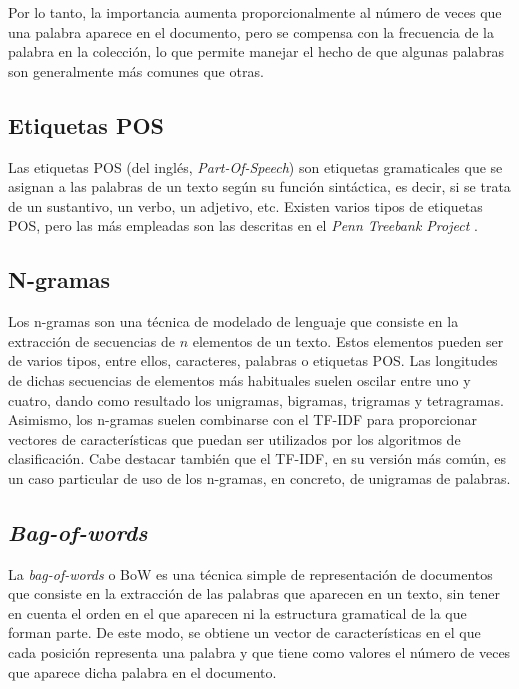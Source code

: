 \bigskip
Por lo tanto, la importancia aumenta proporcionalmente al número de veces que una palabra aparece en el documento, pero se compensa con la frecuencia
de la palabra en la colección, lo que permite manejar el hecho de que algunas palabras son generalmente más comunes que otras.

\subsection{Etiquetas POS}

Las etiquetas POS (del inglés, \textit{Part-Of-Speech}) son etiquetas gramaticales que se asignan a las palabras de un texto según su función sintáctica, es
decir, si se trata de un sustantivo, un verbo, un adjetivo, etc.
Existen varios tipos de etiquetas POS, pero las más empleadas son las descritas en el \textit{Penn Treebank Project} \cite{marcus1993building}.

\subsection{N-gramas}

Los n-gramas son una técnica de modelado de lenguaje que consiste en la extracción de secuencias de $n$ elementos de un texto. Estos elementos pueden ser de varios
tipos, entre ellos, caracteres, palabras o etiquetas POS. Las longitudes de dichas secuencias de elementos más habituales suelen oscilar entre uno y cuatro, dando como resultado los unigramas, bigramas,
trigramas y tetragramas.
Asimismo, los n-gramas suelen combinarse con el TF-IDF para proporcionar vectores de características que puedan ser utilizados por los algoritmos de clasificación.
Cabe destacar también que el TF-IDF, en su versión más común, es un caso particular de uso de los n-gramas, en concreto, de unigramas de palabras.

\subsection{\textit{Bag-of-words}}
\label{sec:bag_of_words}

La \textit{bag-of-words} o BoW es una técnica simple de representación de documentos que consiste en la extracción de las palabras que aparecen en un texto,
sin tener en cuenta el orden en el que aparecen ni la estructura gramatical de la que forman parte. De este modo, se obtiene un vector de características en el
que cada posición representa una palabra y que tiene como valores el número de veces que aparece dicha palabra en el documento.

